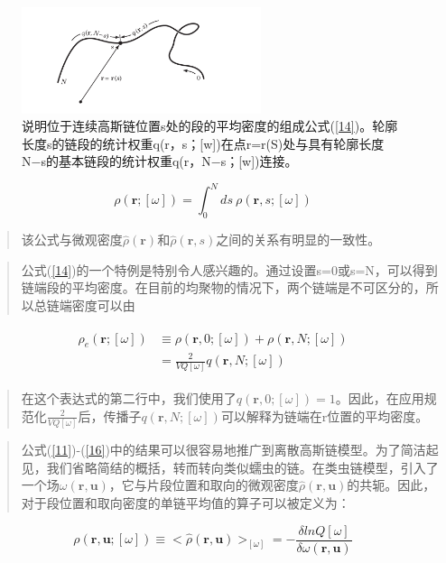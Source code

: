 \begin{figure}[ht]
\centering
\includegraphics[width=7cm]{./figures/32.png}
\caption{说明位于连续高斯链位置s处的段的平均密度的组成公式(\ref{14})。轮廓长度s的链段的统计权重q(r，s；[w])在点r=r(S)处与具有轮廓长度N−s的基本链段的统计权重q(r，N−s；[w])连接。}
\label{figure1}
\end{figure}
\begin{equation}\label{15}
\rho(\mathbf{r};[\omega])=\int_{0}^{N}ds~\rho(\mathbf{r},s;[\omega])
\end{equation}
\begin{quotation}
该公式与微观密度$\hat{\rho}(\mathbf{r})$和$\hat{\rho}(\mathbf{r},s)$之间的关系有明显的一致性。
\end{quotation}
\begin{quotation}
公式(\ref{14})的一个特例是特别令人感兴趣的。通过设置s=0或s=N，可以得到链端段的平均密度。在目前的均聚物的情况下，两个链端是不可区分的，所以总链端密度可以由
\end{quotation}
\begin{align}\label{16}
\begin{split}
\rho_e(\mathbf{r};[\omega])&\equiv \rho(\mathbf{r},0;[\omega])+\rho(\mathbf{r},N;[\omega])\\  &=\frac{2}{VQ[\omega]}q(\mathbf{r},N;[\omega])
\end{split}
\end{align}
\begin{quotation}
在这个表达式的第二行中，我们使用了$q(\mathbf{r},0;[\omega])=1$。因此，在应用规范化$\frac{2}{VQ[\omega]}$后，传播子$q(\mathbf{r},N;[\omega])$可以解释为链端在r位置的平均密度。
\end{quotation}
\begin{quotation}
公式(\ref{11})-(\ref{16})中的结果可以很容易地推广到离散高斯链模型。为了简洁起见，我们省略简结的概括，转而转向类似蠕虫的链。在类虫链模型，引入了一个场$\omega(\mathbf{r},\mathbf{u})$，它与片段位置和取向的微观密度$\hat{\rho}(\mathbf{r},\mathbf{u})$的共轭。因此，对于段位置和取向密度的单链平均值的算子可以被定义为：
\end{quotation}
\begin{equation}\label{17}
\rho(\mathbf{r},\mathbf{u};[\omega])\equiv <\hat{\rho}(\mathbf{r},\mathbf{u})>_{[\omega]}=-\frac{\delta lnQ[\omega]}{\delta \omega(\mathbf{r},\mathbf{u})}
\end{equation}
